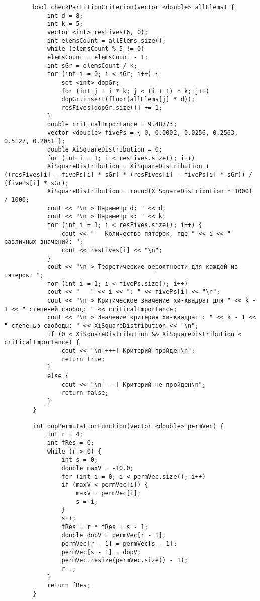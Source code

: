 \documentclass[bachelor, och, coursework]{shiza}
\begin{document}
\begin{verbatim}
		bool checkPartitionCriterion(vector <double> allElems) {
			int d = 8;
			int k = 5;
			vector <int> resFives(6, 0);
			int elemsCount = allElems.size();
			while (elemsCount % 5 != 0)
			elemsCount = elemsCount - 1;
			int sGr = elemsCount / k;
			for (int i = 0; i < sGr; i++) {
				set <int> dopGr;
				for (int j = i * k; j < (i + 1) * k; j++)
				dopGr.insert(floor(allElems[j] * d));
				resFives[dopGr.size()] += 1;
			}
			double criticalImportance = 9.48773;
			vector <double> fivePs = { 0, 0.0002, 0.0256, 0.2563, 0.5127, 0.2051 };
			double XiSquareDistribution = 0;
			for (int i = 1; i < resFives.size(); i++)
			XiSquareDistribution = XiSquareDistribution + ((resFives[i] - fivePs[i] * sGr) * (resFives[i] - fivePs[i] * sGr)) / (fivePs[i] * sGr);
			XiSquareDistribution = round(XiSquareDistribution * 1000) / 1000;
			cout << "\n > Параметр d: " << d;
			cout << "\n > Параметр k: " << k;
			for (int i = 1; i < resFives.size(); i++) {
				cout << "   Количество пятерок, где " << i << " различных значений: ";
				cout << resFives[i] << "\n";
			}
			cout << "\n > Теоретические вероятности для каждой из пятерок: ";
			for (int i = 1; i < fivePs.size(); i++)
			cout << "   " << i << ": " << fivePs[i] << "\n";
			cout << "\n > Критическое значение хи-квадрат для " << k - 1 << " степеней свобод: " << criticalImportance;
			cout << "\n > Значение критерия хи-квадрат с " << k - 1 << " степенью свободы: " << XiSquareDistribution << "\n";
			if (0 < XiSquareDistribution && XiSquareDistribution < criticalImportance) {
				cout << "\n[+++] Критерий пройден\n";
				return true;
			}
			else {
				cout << "\n[---] Критерий не пройден\n";
				return false;
			}
		}
		
		int dopPermutationFunction(vector <double> permVec) {
			int r = 4;
			int fRes = 0;
			while (r > 0) {
				int s = 0;
				double maxV = -10.0;
				for (int i = 0; i < permVec.size(); i++)
				if (maxV < permVec[i]) {
					maxV = permVec[i];
					s = i;
				}
				s++;
				fRes = r * fRes + s - 1;
				double dopV = permVec[r - 1];
				permVec[r - 1] = permVec[s - 1];
				permVec[s - 1] = dopV;
				permVec.resize(permVec.size() - 1);
				r--;
			}
			return fRes;
		}
		

\end{verbatim}
\end{document}
